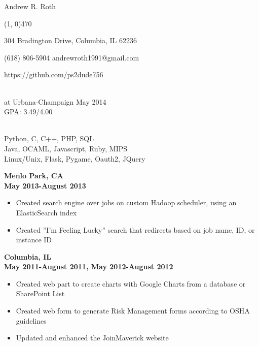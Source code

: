\documentclass[11pt]{article}
\begin{document}
  \centerline{{\Huge \sc Andrew R. Roth}}
  \noindent\line(1, 0){470}\\
  \centerline{
      304 Bradington Drive,
      Columbia,
      IL 62236
  }
  \centerline{
    (618) 806-5904
    \indent andrewroth1991@gmail.com
  }
  \centerline{
    \url{https://github.com/ps2dude756}
  }

  \bigskip

  \\
     at Urbana-Champaign \hfill 
      May 2014\\
     \hfill GPA: 3.49/4.00\\

  \bigskip

  \\
     Python, C, C++, PHP, SQL\\
     Java, OCAML, Javascript, Ruby, MIPS\\
     Linux/Unix, Flask, Pygame, Oauth2, JQuery

  \bigskip

    \smallskip

     \hfill {\bf Menlo Park, CA}\\
     \hfill {\bf May 2013-August 2013}
    \begin{itemize}[noitemsep,topsep=0pt]
      \item Created search engine over jobs on custom Hadoop scheduler, using 
        an ElasticSearch index
      \item Created ''I'm Feeling Lucky'' search that redirects based on job 
        name, ID, or instance ID
    \end{itemize}
    \medskip

     \hfill {\bf Columbia, IL}\\
     \hfill {\bf May 2011-August 2011, May 2012-August 2012}
    \begin{itemize}[noitemsep,topsep=0pt]
      \item Created web part to create charts with Google Charts from a database or SharePoint List
      \item Created web form to generate Risk Management forms according to OSHA guidelines
      \item Updated and enhanced the JoinMaverick website
    \end{itemize}
\end{document}
